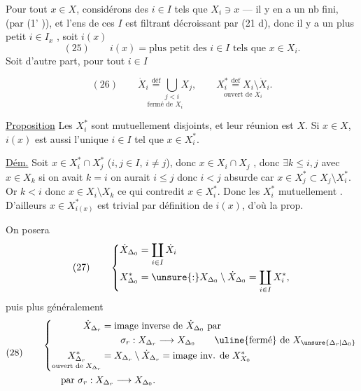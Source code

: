 Pour tout $x\in X$, considérons  des $i\in I$ tels
que $X_i\ni x$ --- il y en a un nb fini, 
(par (1' )), et l'ens de ces $I$ est filtrant
décroissant par (21 d), donc il y a
un plus petit $i\in I_x$ , soit $i(x)$
\[
(25)\qquad i(x)=\text{plus petit des }i\in I\text{ tels que }x\in X_i.
\]
Soit d'autre part, pour tout $i\in I$

\[
(26)\qquad
\underset{\text{fermé de }X_i}{\dot X_i\overset{\text{déf}}=\bigcup_{j<i}X_j},
\qquad
\underset{\text{ouvert de }X_i}{X_i^*\overset{\mathrm{def}}=X_i\setminus\dot X_i}.
\]


\uline{Proposition} Les $X_i^*$ sont mutuellement disjoints, et leur réunion est $X$. Si $x\in X$, $i(x)$ est aussi l'unique $i\in I$ tel que $x\in X_i^*$.

\uline{Dém.} Soit $x\in X_i^*\cap X_j^*$ ($i,j\in I$, $i\ne j$), donc  $x\in X_i\cap X_j$ , donc $\exists k\leq i,j$ avec
$x\in X_k$ si on avait $k=i$ on aurait $i\leq j$ donc $i<j$ absurde car $x\in X_j^*\subset X_j\setminus X_i^*$.
Or $k<i$ donc $x\in X_i\setminus X_k$ ce qui contredit $x\in X_i^*$. Donc les $X_i^*$ mutuellement . D'ailleurs $x\in X_{i(x)}^*$ est trivial par définition de $i(x)$, d'où la prop.

On posera
\[
(27)\qquad
\left\{\begin{aligned}
\dot X_{\Delta_0}&=\coprod_{i\in I}\dot X_i\\
X_{\Delta_0}^*&=\unsure{:}X_{\Delta_0}\setminus\dot X_{\Delta_0}=\coprod_{i\in I}X_i^*,
\end{aligned}\right.
\]
puis  plus généralement
\[
(28)\qquad
\begin{aligned}
&\left\{\begin{aligned}
\dot X_{\Delta_r}&=\text{image inverse de }\dot X_{\Delta_0}\text{ par}\\
&\qquad\sigma_r:X_{\Delta_r}\longrightarrow X_{\Delta_0}
\qquad\text{\uline{fermé} de }X_{\unsure{\Delta_r|\Delta_0}}\\
\underset{\text{ouvert de }X_{\Delta_r}}{X_{\Delta_r}^*}&=X_{\Delta_r}\setminus\dot X_{\Delta_r}=\text{image inv. de }X_{X_0}^*
\end{aligned}\right.\\
&\qquad\text{par }\sigma_r:X_{\Delta_r}\longrightarrow X_{\Delta_0}.
\end{aligned}
\]

